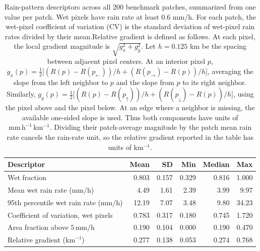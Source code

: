 \begin{table}[!htbp]\centering\small\begin{tabular}{lrrrrr}
\toprule Descriptor & Mean & SD & Min & Median & Max \\
\midrule
Wet fraction & 0.803 & 0.157 & 0.329 & 0.816 & 1.000 \\
Mean wet rain rate ($\mathrm{mm/h}$) & 4.49 & 1.61 & 2.39 & 3.99 & 9.97 \\
95th percentile wet rain rate ($\mathrm{mm/h}$) & 12.19 & 7.07 & 3.48 & 9.80 & 34.23 \\
Coefficient of variation, wet pixels & 0.783 & 0.317 & 0.180 & 0.745 & 1.720 \\
Area fraction above $5\,\mathrm{mm/h}$ & 0.190 & 0.104 & 0.000 & 0.190 & 0.470 \\
Relative gradient ($\mathrm{km}^{-1}$) & 0.277 & 0.138 & 0.053 & 0.274 & 0.768 \\
\bottomrule\end{tabular}
\caption{Rain-pattern descriptors across all 200 benchmark patches, summarized from one value per patch. Wet pixels have rain rate at least 0.6 mm/h. For each patch, the wet-pixel coefficient of variation (CV) is the standard deviation of wet-pixel rain rates divided by their mean.\newline Relative gradient is defined as follows. At each pixel, the local gradient magnitude is $\sqrt{g_x^2+g_y^2}$. Let $h=0.125$ km be the spacing between adjacent pixel centers. At an interior pixel $p$, $g_x(p)=\tfrac12\bigl[(R(p)-R(p_{\leftarrow}))/h+(R(p_{\rightarrow})-R(p))/h\bigr]$, averaging the slope from the left neighbor to $p$ and the slope from $p$ to its right neighbor. Similarly, $g_y(p)=\tfrac12\bigl[(R(p)-R(p_{\uparrow}))/h+(R(p_{\downarrow})-R(p))/h\bigr]$, using the pixel above and the pixel below. At an edge where a neighbor is missing, the available one-sided slope is used. Thus both components have units of $\mathrm{mm\,h^{-1}\,km^{-1}}$. Dividing their patch-average magnitude by the patch mean rain rate cancels the rain-rate unit, so the relative gradient reported in the table has units of $\mathrm{km^{-1}}$.}
\label{tab:patch_rain_patterns}
\end{table}
